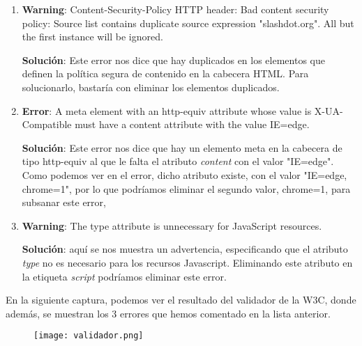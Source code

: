 \begin{enumerate}
    \item \textbf{Warning}: Content-Security-Policy HTTP header: Bad content security policy: Source list contains duplicate source expression "slashdot.org". All but the first instance will be ignored.

    \textbf{Solución}: Este error nos dice que hay duplicados en los elementos que definen la política segura de contenido en la cabecera HTML. Para solucionarlo, bastaría con eliminar los elementos duplicados.

    \item \textbf{Error}: A meta element with an http-equiv attribute whose value is X-UA-Compatible must have a content attribute with the value IE=edge.

    \textbf{Solución}: Este error nos dice que hay un elemento meta en la cabecera de tipo http-equiv al que le falta el atributo \textit{content} con el valor "IE=edge". Como podemos ver en el error, dicho atributo existe, con el valor "IE=edge, chrome=1", por lo que podríamos eliminar el segundo valor, chrome=1, para subsanar este error,

    \item \textbf{Warning}: The type attribute is unnecessary for JavaScript resources.

    \textbf{Solución}: aquí se nos muestra un advertencia, especificando que el atributo \textit{type} no es necesario para los recursos Javascript. Eliminando este atributo en la etiqueta \textit{script} podríamos eliminar este error.
\end{enumerate}

En la siguiente captura, podemos ver el resultado del validador de la W3C, donde además, se muestran los 3 errores que hemos comentado en la lista anterior.

\begin{figure}[H]
    \centering
    \texttt{[image: validador.png]}
\end{figure}




%
%

